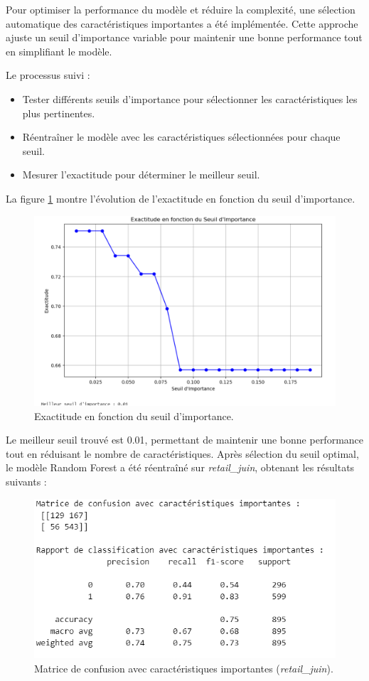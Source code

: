 Pour optimiser la performance du modèle et réduire la complexité, une sélection automatique des caractéristiques importantes a été implémentée. Cette approche ajuste un seuil d'importance variable pour maintenir une bonne performance tout en simplifiant le modèle.

Le processus suivi :
\begin{itemize}
    \item Tester différents seuils d'importance pour sélectionner les caractéristiques les plus pertinentes.
    \item Réentraîner le modèle avec les caractéristiques sélectionnées pour chaque seuil.
    \item Mesurer l'exactitude pour déterminer le meilleur seuil.
\end{itemize}

La figure \ref{fig:seuil_importance} montre l'évolution de l'exactitude en fonction du seuil d'importance.

\begin{figure}[H]
    \centering
    \includegraphics[width=0.5\linewidth]{capture_modele_38.png}
    \caption{Exactitude en fonction du seuil d'importance.}
    \label{fig:seuil_importance}
\end{figure}

Le meilleur seuil trouvé est 0.01, permettant de maintenir une bonne performance tout en réduisant le nombre de caractéristiques. Après sélection du seuil optimal, le modèle Random Forest a été réentraîné sur \textit{retail\_juin}, obtenant les résultats suivants :

\begin{figure}[H]
    \centering
    \includegraphics[width=0.6\linewidth]{capture_modele_39.png}
    \caption{Matrice de confusion avec caractéristiques importantes (\textit{retail\_juin}).}
    \label{fig:confusion_rf_imp}
\end{figure}

